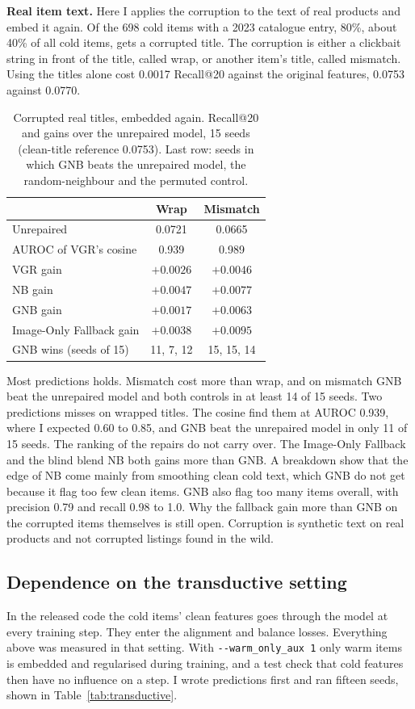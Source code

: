 \documentclass[conference]{IEEEtran}
\begin{document}
\textbf{Real item text.} Here I applies the corruption to the text of real products and embed it again. Of the 698 cold items with a 2023 catalogue entry, 80\%, about 40\% of all cold items, gets a corrupted title. The corruption is either a clickbait string in front of the title, called wrap, or another item's title, called mismatch. Using the titles alone cost 0.0017 Recall@20 against the original features, 0.0753 against 0.0770.

\begin{table}[!htb]
\centering\caption{Corrupted real titles, embedded again. Recall@20 and gains over the unrepaired model, 15 seeds (clean-title reference 0.0753). Last row: seeds in which GNB beats the unrepaired model, the random-neighbour and the permuted control.}
\label{tab:realtext}
\begin{tabular}{lcc}
\toprule
 & Wrap & Mismatch \\
\midrule
Unrepaired & 0.0721 & 0.0665 \\
AUROC of VGR's cosine & 0.939 & 0.989 \\
VGR gain & $+0.0026$ & $+0.0046$ \\
NB gain & $+0.0047$ & $+0.0077$ \\
GNB gain & $+0.0017$ & $+0.0063$ \\
Image-Only Fallback gain & $+0.0038$ & $+0.0095$ \\
GNB wins (seeds of 15) & 11, 7, 12 & 15, 15, 14 \\
\bottomrule
\end{tabular}
\end{table}

Most predictions holds. Mismatch cost more than wrap, and on mismatch GNB beat the unrepaired model and both controls in at least 14 of 15 seeds. Two predictions misses on wrapped titles. The cosine find them at AUROC 0.939, where I expected 0.60 to 0.85, and GNB beat the unrepaired model in only 11 of 15 seeds. The ranking of the repairs do not carry over. The Image-Only Fallback and the blind blend NB both gains more than GNB. A breakdown show that the edge of NB come mainly from smoothing clean cold text, which GNB do not get because it flag too few clean items. GNB also flag too many items overall, with precision 0.79 and recall 0.98 to 1.0. Why the fallback gain more than GNB on the corrupted items themselves is still open. Corruption is synthetic text on real products and not corrupted listings found in the wild.

\subsection{Dependence on the transductive setting}
\label{sec:transductive}
In the released code the cold items' clean features goes through the model at every training step. They enter the alignment and balance losses. Everything above was measured in that setting. With \texttt{-{}-warm\_only\_aux 1} only warm items is embedded and regularised during training, and a test check that cold features then have no influence on a step. I wrote predictions first and ran fifteen seeds, shown in Table~\ref{tab:transductive}.
\end{document}
